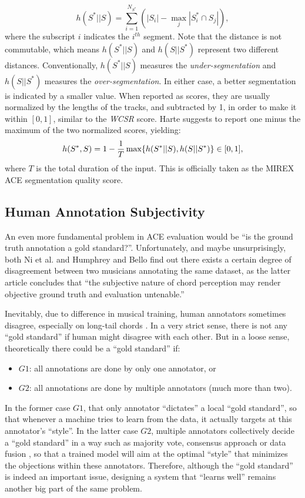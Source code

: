 \begin{equation}
h(S^*||S) = \sum_{i=1}^{N_{S^*}}(|S_i|-\max_j|S_i^* \cap S_j|),
\end{equation}
where the subscript $i$ indicates the $i^{th}$ segment. Note that the distance is not commutable, which means $h(S^*||S)$ and $h(S||S^*)$ represent two different distances. Conventionally, $h(S^*||S)$ measures the {\it under-segmentation} and $h(S||S^*)$ measures the {\it over-segmentation}. In either case, a better segmentation is indicated by a smaller value. When reported as scores, they are usually normalized by the lengths of the tracks, and subtracted by 1, in order to make it within $[0,1]$, similar to the \textit{WCSR} score. Harte \cite{harte2010towards} suggests to report one minus the maximum of the two normalized scores, yielding:
\begin{equation}
h(S^*,S)=1-{1\over T}\max\{h(S^*||S), h(S||S^*)\} \in [0,1],
\end{equation}
where $T$ is the total duration of the input. This is officially taken as the MIREX ACE segmentation quality score.

\subsection{Human Annotation Subjectivity} \label{sec:2-subjectivity}
An even more fundamental problem in ACE evaluation would be ``is the ground truth annotation a gold standard?''. Unfortunately, and maybe unsurprisingly, both Ni et al. \cite{ni2013understanding} and Humphrey and Bello \cite{humphreyfour} find out there exists a certain degree of disagreement between two musicians annotating the same dataset, as the latter article concludes that ``the subjective nature of chord perception may render objective ground truth and evaluation untenable.''

Inevitably, due to difference in musical training, human annotators sometimes disagree, especially on long-tail chords \cite{humphreyfour}. In a very strict sense, there is not any ``gold standard'' if human might disagree with each other. But in a loose sense, theoretically there could be a ``gold standard'' if:
\begin{itemize}
\item $G1$: all annotations are done by only one annotator, or
\item $G2$: all annotations are done by multiple annotators (much more than two).
\end{itemize}
In the former case $G1$, that only annotator ``dictates'' a local ``gold standard'', so that whenever a machine tries to learn from the data, it actually targets at this annotator's ``style''. In the latter case $G2$, multiple annotators collectively decide a ``gold standard'' in a way such as majority vote, consensus approach \cite{ni2013understanding} or data fusion \cite{koopsintegration,klein2004sensor}, so that a trained model will aim at the optimal ``style'' that minimizes the objections within these annotators. Therefore, although the ``gold standard'' is indeed an important issue, designing a system that ``learns well'' remains another big part of the same problem.

